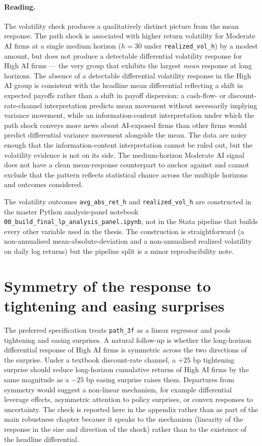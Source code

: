 \paragraph{Reading.} The volatility check produces a qualitatively
distinct picture from the mean response. The path shock is
associated with higher return volatility for Moderate AI firms at a
single medium horizon ($h = 30$ under \texttt{realized\_vol\_h}) by
a modest amount, but does not produce a detectable differential
volatility response for High AI firms --- the very group that
exhibits the largest \emph{mean} response at long horizons. The
absence of a detectable differential volatility response in the
High AI group is consistent with the headline mean differential
reflecting a shift in expected payoffs rather than a shift in
payoff dispersion: a cash-flow- or discount-rate-channel
interpretation predicts mean movement without necessarily implying
variance movement, while an information-content interpretation
under which the path shock conveys more news about AI-exposed firms
than other firms would predict differential variance movement
alongside the mean. The data are noisy enough that the
information-content interpretation cannot be ruled out, but the
volatility evidence is not on its side. The medium-horizon Moderate
AI signal does not have a clean mean-response counterpart to anchor
against and cannot exclude that the pattern reflects statistical
chance across the multiple horizons and outcomes considered.

The volatility outcomes \texttt{avg\_abs\_ret\_h} and
\texttt{realized\_vol\_h} are constructed in the master Python
analysis-panel notebook \texttt{00\_build\_final\_lp\_analysis\_panel.ipynb},
not in the Stata pipeline that builds every other variable used in
the thesis. The construction is straightforward (a non-annualised
mean-absolute-deviation and a non-annualised realized volatility on
daily log returns) but the pipeline split is a minor
reproducibility note.

\section{Symmetry of the response to tightening and easing surprises}
\label{app:rob-asymmetry}

The preferred specification treats \texttt{path\_3f} as a linear
regressor and pools tightening and easing surprises. A natural
follow-up is whether the long-horizon differential response of High
AI firms is symmetric across the two directions of the surprise.
Under a textbook discount-rate channel, a $+25$ bp tightening
surprise should reduce long-horizon cumulative returns of High AI
firms by the same magnitude as a $-25$ bp easing surprise raises
them. Departures from symmetry would suggest a non-linear mechanism,
for example differential leverage effects, asymmetric attention to
policy surprises, or convex responses to uncertainty. The check is
reported here in the appendix rather than as part of the main
robustness chapter because it speaks to the mechanism (linearity of
the response in the size and direction of the shock) rather than to
the existence of the headline differential.

